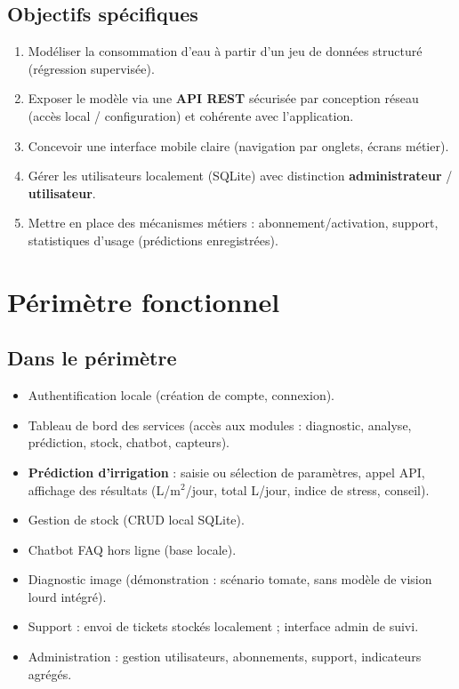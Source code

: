 \documentclass[12pt,a4paper,twoside,openright]{report}
\begin{document}
\subsection{Objectifs spécifiques}
\begin{enumerate}
  \item Modéliser la consommation d'eau à partir d'un jeu de données structuré (régression supervisée).
  \item Exposer le modèle via une \textbf{API REST} sécurisée par conception réseau (accès local / configuration) et cohérente avec l'application.
  \item Concevoir une interface mobile claire (navigation par onglets, écrans métier).
  \item Gérer les utilisateurs localement (SQLite) avec distinction \textbf{administrateur} / \textbf{utilisateur}.
  \item Mettre en place des mécanismes métiers : abonnement/activation, support, statistiques d'usage (prédictions enregistrées).
\end{enumerate}

\section{Périmètre fonctionnel}

\subsection{Dans le périmètre}
\begin{itemize}
  \item Authentification locale (création de compte, connexion).
  \item Tableau de bord des services (accès aux modules : diagnostic, analyse, prédiction, stock, chatbot, capteurs).
  \item \textbf{Prédiction d'irrigation} : saisie ou sélection de paramètres, appel API, affichage des résultats (L/m$^2$/jour, total L/jour, indice de stress, conseil).
  \item Gestion de stock (CRUD local SQLite).
  \item Chatbot FAQ hors ligne (base locale).
  \item Diagnostic image (démonstration : scénario tomate, sans modèle de vision lourd intégré).
  \item Support : envoi de tickets stockés localement ; interface admin de suivi.
  \item Administration : gestion utilisateurs, abonnements, support, indicateurs agrégés.
\end{itemize}
\end{document}
